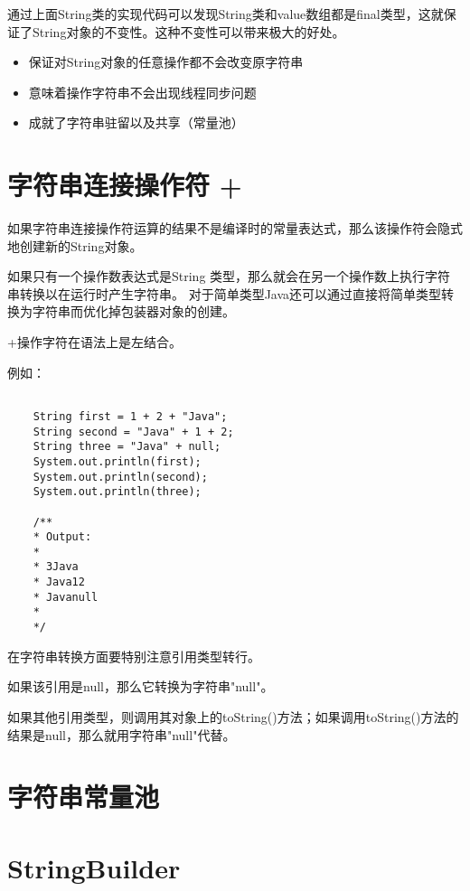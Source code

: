 通过上面String类的实现代码可以发现String类和value数组都是final类型，这就保证了String对象的不变性。这种不变性可以带来极大的好处。

\begin{itemize}
    \item 保证对String对象的任意操作都不会改变原字符串
    \item 意味着操作字符串不会出现线程同步问题
    \item 成就了字符串驻留以及共享（常量池）
\end{itemize}



\section{字符串连接操作符 + }


如果字符串连接操作符运算的结果不是编译时的常量表达式，那么该操作符会隐式地创建新的String对象。


如果只有一个操作数表达式是String 类型，那么就会在另一个操作数上执行字符串转换以在运行时产生字符串。 
对于简单类型Java还可以通过直接将简单类型转换为字符串而优化掉包装器对象的创建。

\textcolor{codepurple}{+}操作字符在语法上是左结合。

例如：

\begin{lstlisting}[style=cjava]

    String first = 1 + 2 + "Java";
    String second = "Java" + 1 + 2;
    String three = "Java" + null;
    System.out.println(first);
    System.out.println(second);
    System.out.println(three);

    /** 
    * Output: 
    * 
    * 3Java
    * Java12
    * Javanull
    * 
    */

\end{lstlisting}


在字符串转换方面要特别注意引用类型转行。

如果该引用是null，那么它转换为字符串"null"。

如果其他引用类型，则调用其对象上的toString()方法；如果调用toString()方法的结果是null，那么就用字符串"null"代替。


\section{字符串常量池}




\section{StringBuilder}


